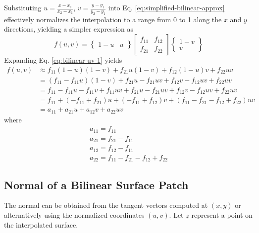 \documentclass[
10pt, %
a4paper, %
oneside, %
headinclude,footinclude, %
BCOR5mm, %
]{scrartcl}
\begin{document}
Substituting $u=\frac{x-x_1}{x_2 - x_1}$, $v=\frac{y-y_1}{y_2 - y_1}$ into Eq. \eqref{eq:simplified-bilinear-approx} effectively normalizes the interpolation to a range from 0 to 1 along the $x$ and $y$ directions, yielding a simpler expression as
\begin{equation}
  \label{eq:bilinear-uv-1}
f(u,v) = \begin{Bmatrix} 1 - u & u \end{Bmatrix} \begin{bmatrix}f_{11} & f_{12}\\f_{21} & f_{22} \end{bmatrix} \begin{Bmatrix} 1 - v \\ v \end{Bmatrix}
\end{equation}
Expanding Eq. \eqref{eq:bilinear-uv-1} yields
\begin{equation}
  \label{eq:bilinear-uv-2}
  \begin{split}
  f(u,v) &\approx f_{11}(1-u)(1-v) + f_{21} u (1-v) + f_{12} (1- u) v + f_{22} u v\\
  &= (f_{11} - f_{11} u) (1 - v) + f_{21} u - f_{21} u v + f_{12}v - f_{12} u v + f_{22}uv\\
  &= f_{11} - f_{11} u - f_{11} v + f_{11} u v + f_{21} u - f_{21} u v + f_{12}v - f_{12} u v + f_{22}uv\\
  &= f_{11} + (-f_{11} + f_{21}) u + (-f_{11} + f_{12}) v + (f_{11} - f_{21} - f_{12} + f_{22}) u v\\
  &= a_{11} + a_{21} u + a_{12} v + a_{22} u v
  \end{split}
\end{equation}
where
\begin{equation}
  \begin{split}
    a_{11} = f_{11}\\
    a_{21} = f_{21} - f_{11}\\
    a_{12} = f_{12} - f_{11}\\
    a_{22} = f_{11} - f_{21} - f_{12} + f_{22}
  \end{split}
\end{equation}

\subsection{Normal of a Bilinear Surface Patch}
The normal can be obtained from the tangent vectors computed at $(x,y)$ or alternatively using the normalized coordinates $(u,v)$. Let $\underline{z}$ represent a point on the interpolated surface.
\end{document}
